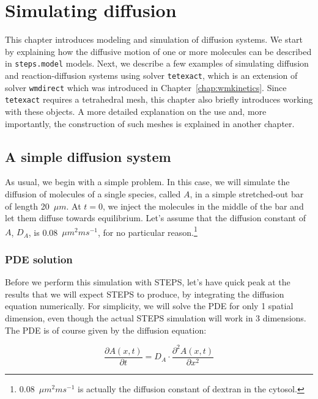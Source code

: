 \documentclass[a4paper,12pt]{book}
\begin{document}
\chapter{Simulating diffusion}\label{chap:simulatingdiffusion}

This chapter introduces modeling and simulation of diffusion systems. We start by explaining how the diffusive motion of one or more molecules can be described in \texttt{steps.model} models. Next, we describe a few examples of simulating diffusion and reaction-diffusion systems using solver \texttt{tetexact}, which is an extension of solver \texttt{wmdirect} which was introduced in Chapter~\ref{chap:wmkinetics}. Since \texttt{tetexact} requires a tetrahedral mesh, this chapter also briefly introduces working with these objects. A more detailed explanation on the use and, more importantly, the construction of such meshes is explained in another chapter.

\section{A simple diffusion system}

As usual, we begin with a simple problem. In this case, we will simulate the diffusion of molecules of a single species, called $A$, in a simple stretched-out bar of length 20~$\mu m$. At $t=0$, we inject the molecules in the middle of the bar and let them diffuse towards equilibrium. Let's assume that the diffusion constant of $A$, $D_{A}$, is 0.08~$\mu m^{2}ms^{-1}$, for no particular reason.\footnote{0.08~$\mu m^{2}ms^{-1}$ is actually the diffusion constant of dextran in the cytosol.}

\subsection{PDE solution}

Before we perform this simulation with STEPS, let's have quick peak at the results that we will expect STEPS to produce, by integrating the diffusion equation numerically. For simplicity, we will solve the PDE for only 1 spatial dimension, even though the actual STEPS simulation will work in 3 dimensions. The PDE is of course given by the diffusion equation:

\begin{equation}\label{eqn:simplediffusion01}
\frac{\partial A(x,t)}{\partial t} = D_A \cdot \frac{\partial^2 A(x,t)}{\partial x^2}
\end{equation}
\end{document}
